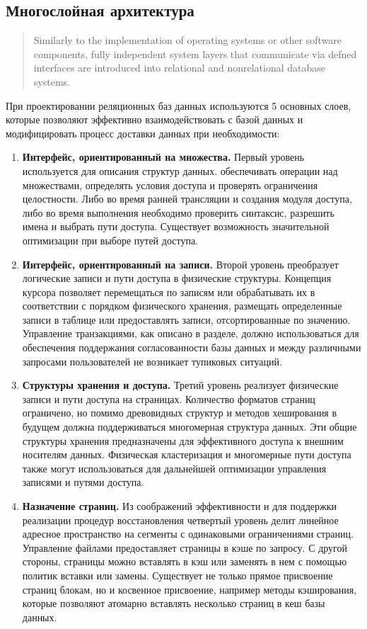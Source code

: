 \documentclass{article}
\begin{document}
\subsection{Многослойная архитектура}
\begin{quote}
Similarly to the implementation of 
operating systems or other software components, fully independent system layers that 
communicate via defned interfaces are introduced into relational and nonrelational database systems.
\end{quote}
При проектировании реляционных баз данных используются 5 основных слоев, которые позволяют эффективно взаимодействовать с базой данных и модифицировать процесс доставки данных при необходимости:
\begin{enumerate}
    \item \textbf{Интерфейс, ориентированный на множества.} Первый уровень используется для описания структур данных.
    обеспечивать операции над множествами, определять условия доступа и проверять ограничения целостности. Либо во время ранней трансляции и создания модуля доступа, либо во время выполнения необходимо проверить синтаксис, разрешить имена и выбрать пути доступа. Существует возможность значительной оптимизации при выборе путей доступа.
    \item \textbf{Интерфейс, ориентированный на записи.} Второй уровень преобразует логические записи и пути доступа в физические структуры. Концепция курсора позволяет перемещаться по записям или обрабатывать их в соответствии с порядком физического хранения, размещать определенные записи в таблице или предоставлять записи, отсортированные по значению. Управление транзакциями, как описано в разделе, должно использоваться для обеспечения поддержания согласованности базы данных и
    между различными запросами пользователей не возникает тупиковых ситуаций.
    \item \textbf{Структуры хранения и доступа.} Третий уровень реализует физические записи и пути доступа на страницах. Количество форматов страниц ограничено, но помимо древовидных структур и методов хеширования в будущем должна поддерживаться многомерная структура данных. Эти общие структуры хранения предназначены для эффективного доступа к внешним носителям данных. Физическая кластеризация и многомерные пути доступа также могут использоваться для дальнейшей оптимизации управления записями и путями доступа.
    \item \textbf{Назначение страниц.} Из соображений эффективности и для поддержки реализации процедур восстановления четвертый уровень делит линейное адресное пространство на сегменты с одинаковыми ограничениями страниц. Управление файлами предоставляет страницы в кэше по запросу. С другой стороны, страницы можно вставлять в кэш или заменять в нем с помощью политик вставки или замены. Существует не только прямое присвоение страниц блокам, но и косвенное присвоение, например методы кэширования, которые позволяют атомарно вставлять несколько страниц в кеш базы данных.

\end{enumerate}
\end{document}

